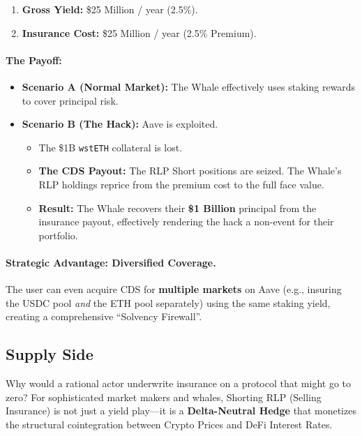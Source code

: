 \documentclass[12pt]{article}
\begin{document}
\begin{enumerate}
    \item \textbf{Gross Yield:} \$25 Million / year (2.5\%).
    \item \textbf{Insurance Cost:} \$25 Million / year (2.5\% Premium).
\end{enumerate}

\paragraph{The Payoff:}

\begin{itemize}
    \item \textbf{Scenario A (Normal Market):} The Whale effectively uses staking rewards to cover principal risk.
    \item \textbf{Scenario B (The Hack):} Aave is exploited.
    \begin{itemize}
        \item The \$1B \texttt{wstETH} collateral is lost.
        \item \textbf{The CDS Payout:} The RLP Short positions are seized. The Whale's RLP holdings reprice from the premium cost to the full face value.
        \item \textbf{Result:} The Whale recovers their \textbf{\$1 Billion} principal from the insurance payout, effectively rendering the hack a non-event for their portfolio.
    \end{itemize}
\end{itemize}

\paragraph{Strategic Advantage: Diversified Coverage.}
The user can even acquire CDS for \textbf{multiple markets} on Aave (e.g., insuring the USDC pool \emph{and} the ETH pool separately) using the same staking yield, creating a comprehensive ``Solvency Firewall''.

\subsection{Supply Side}

Why would a rational actor underwrite insurance on a protocol that might go to zero? For sophisticated market makers and whales, Shorting RLP (Selling Insurance) is not just a yield play---it is a \textbf{Delta-Neutral Hedge} that monetizes the structural cointegration between Crypto Prices and DeFi Interest Rates.
\end{document}
